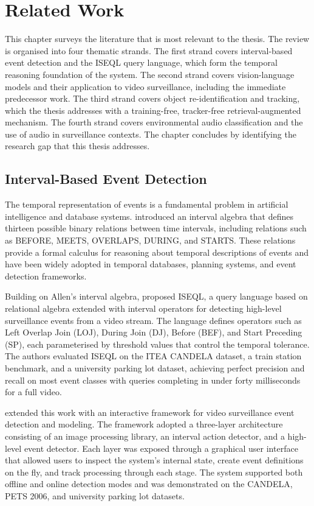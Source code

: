 \chapter{Related Work}
\label{RelatedWork}

This chapter surveys the literature that is most relevant to the thesis. The review is organised into four thematic strands. The first strand covers interval-based event detection and the ISEQL query language, which form the temporal reasoning foundation of the system. The second strand covers vision-language models and their application to video surveillance, including the immediate predecessor work. The third strand covers object re-identification and tracking, which the thesis addresses with a training-free, tracker-free retrieval-augmented mechanism. The fourth strand covers environmental audio classification and the use of audio in surveillance contexts. The chapter concludes by identifying the research gap that this thesis addresses.

\section{Interval-Based Event Detection}

The temporal representation of events is a fundamental problem in artificial intelligence and database systems. \citet{allen1983} introduced an interval algebra that defines thirteen possible binary relations between time intervals, including relations such as BEFORE, MEETS, OVERLAPS, DURING, and STARTS. These relations provide a formal calculus for reasoning about temporal descriptions of events and have been widely adopted in temporal databases, planning systems, and event detection frameworks.

Building on Allen's interval algebra, \citet{helmer2016highlevel} proposed ISEQL, a query language based on relational algebra extended with interval operators for detecting high-level surveillance events from a video stream. The language defines operators such as Left Overlap Join (LOJ), During Join (DJ), Before (BEF), and Start Preceding (SP), each parameterised by threshold values that control the temporal tolerance. The authors evaluated ISEQL on the ITEA CANDELA dataset, a train station benchmark, and a university parking lot dataset, achieving perfect precision and recall on most event classes with queries completing in under forty milliseconds for a full video.

\citet{persia2017interactive} extended this work with an interactive framework for video surveillance event detection and modeling. The framework adopted a three-layer architecture consisting of an image processing library, an interval action detector, and a high-level event detector. Each layer was exposed through a graphical user interface that allowed users to inspect the system's internal state, create event definitions on the fly, and track processing through each stage. The system supported both offline and online detection modes and was demonstrated on the CANDELA, PETS 2006, and university parking lot datasets.

